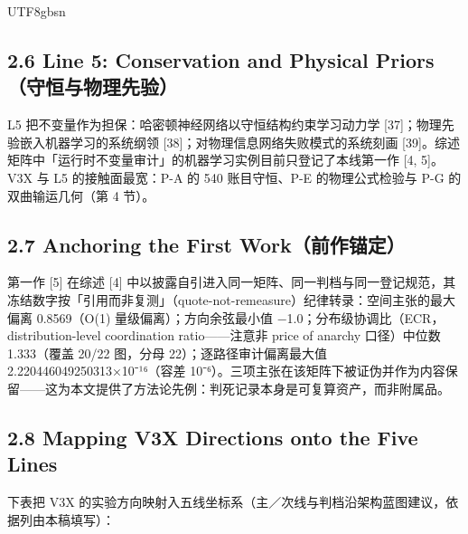 \documentclass[10pt,a4paper]{article}
\begin{document}
\begin{CJK}{UTF8}{gbsn}
\subsection*{2.6 Line 5: Conservation and Physical Priors（守恒与物理先验）}L5 把不变量作为担保：哈密顿神经网络以守恒结构约束学习动力学 [37]；物理先验嵌入机器学习的系统纲领 [38]；对物理信息网络失败模式的系统刻画 [39]。综述矩阵中「运行时不变量审计」的机器学习实例目前只登记了本线第一作 [4, 5]。V3X 与 L5 的接触面最宽：P-A 的 540 账目守恒、P-E 的物理公式检验与 P-G 的双曲输运几何（第 4 节）。

\subsection*{2.7 Anchoring the First Work（前作锚定）}第一作 [5] 在综述 [4] 中以披露自引进入同一矩阵、同一判档与同一登记规范，其冻结数字按「引用而非复测」（quote-not-remeasure）纪律转录：空间主张的最大偏离 0.8569（O(1) 量级偏离）；方向余弦最小值 −1.0；分布级协调比（ECR，distribution-level coordination ratio——注意非 price of anarchy 口径）中位数 1.333（覆盖 20/22 图，分母 22）；逐路径审计偏离最大值 2.220446049250313×10⁻¹⁶（容差 10⁻⁶）。三项主张在该矩阵下被证伪并作为内容保留——这为本文提供了方法论先例：判死记录本身是可复算资产，而非附属品。

\subsection*{2.8 Mapping V3X Directions onto the Five Lines}下表把 V3X 的实验方向映射入五线坐标系（主／次线与判档沿架构蓝图建议，依据列由本稿填写）：



\end{CJK}
\end{document}

